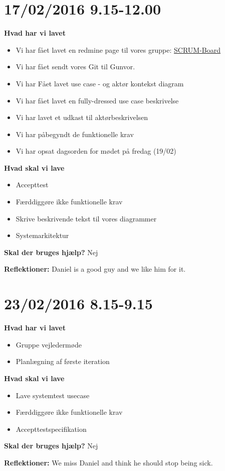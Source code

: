 \documentclass{article}
\begin{document}
	\section{17/02/2016 9.15-12.00}
	\textbf{Hvad har vi lavet}
	\begin{itemize}
		\item Vi har fået lavet en redmine page til vores gruppe: \href{https://redmine.iha.dk/c3prj3_f16/projects/scrum-board/wiki}{SCRUM-Board}
		\item Vi har fået sendt vores Git til Gunvor.
		\item Vi har Fået lavet use case - og aktør kontekst diagram
		\item Vi har fået lavet en fully-dressed use case beskrivelse
		\item Vi har lavet et udkast til aktørbeskrivelsen
		\item Vi har påbegyndt de funktionelle krav
		\item Vi har opsat dagsorden for mødet på fredag (19/02)
	\end{itemize}
	
	\textbf{Hvad skal vi lave}
	\begin{itemize}
		\item Accepttest
		\item Færddiggøre ikke funktionelle krav
		\item Skrive beskrivende tekst til vores diagrammer
		\item Systemarkitektur
	\end{itemize}
	
	\textbf{Skal der bruges hjælp?}
	Nej
	
	\textbf{Reflektioner:}
	Daniel is a good guy and we like him for it.
	
	\section{23/02/2016 8.15-9.15}
	\textbf{Hvad har vi lavet}
	\begin{itemize}
		\item Gruppe vejledermøde
		\item Planlægning af første iteration	
	\end{itemize}
	
	\textbf{Hvad skal vi lave}
	\begin{itemize}
		\item Lave systemtest usecase
		\item Færddiggøre ikke funktionelle krav
		\item Accepttestspecifikation
	\end{itemize}
	
	\textbf{Skal der bruges hjælp?}
	Nej
	
	\textbf{Reflektioner:}
	We miss Daniel and think he should stop being sick.
	
\end{document}
